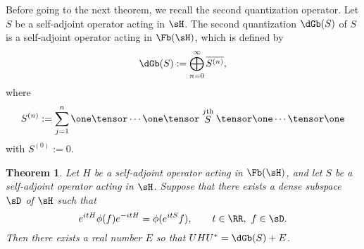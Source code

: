 \documentclass[12pt,draft]{article}
\theoremstyle{plain}
\newtheorem{theorem}{Theorem}[section]
\numberwithin{equation}{section}
\theoremstyle{remark}
\begin{document}
Before going to the next theorem, we recall the second quantization operator.
Let $S$ be a self-adjoint operator acting in $\sH$.
The second quantization $\dGb(S)$ of $S$ is a self-adjoint operator acting in $\Fb(\sH)$, which is defined by
\begin{align*}
  \dGb(S) := \bigoplus_{n=0}^\infty \overline{S^{(n)}},
\end{align*}
where 
\begin{equation}\label{S(n)}
S^{(n)}:= {\sum_{j=1}^{n} \one\tensor\cdots \one\tensor
\stackrel{j\mathrm{th}}{S}\tensor \one\cdots \tensor \one}
\end{equation}
with
$S^{(0)}:=0$.

\begin{theorem}\label{diagonalization}
Let $H$ be a self-adjoint operator acting in $\Fb(\sH)$, and let $S$ be a self-adjoint operator acting in $\sH$.
Suppose that there exists a dense subspace $\sD$ of $\sH$ such that
\begin{equation}\label{covariance}
 e^{itH}\phi(f)e^{-itH}=\phi(e^{itS}f), \qquad  t\in \RR,\ f\in\sD.
\end{equation}
Then there exists a real number $E$ so that $UHU^*=\dGb(S)+E$. 
\end{theorem}
\end{document}
